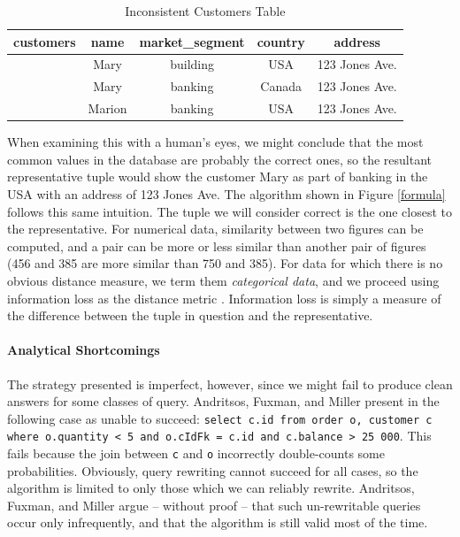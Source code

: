 \begin{table}[h]\begin{center}
        \begin{tabular}{r | c  c  c  c } 
					customers & name & market\_segment & country & address\\ \hline
	           		 & Mary   & building & USA    & 123 Jones Ave. \\ 
	         		 & Mary   & banking  & Canada & 123 Jones Ave. \\ 
					 & Marion & banking  & USA    & 123 Jones Ave. \\ 
        \end{tabular}
        \caption[Inconsistent Customers Table]{Inconsistent Customers Table \cite{CA}\label{rep}}
\end{center}\end{table}

When examining this with a human's eyes, we might conclude that the most common values in the database are probably the correct ones, so the resultant representative tuple would show the customer Mary as part of banking in the USA with an address of 123 Jones Ave. The algorithm shown in Figure \ref{formula} follows this same intuition. The tuple we will consider correct is the one closest to the representative. For numerical data, similarity between two figures can be computed, and a pair can be more or less similar than another pair of figures (456 and 385 are more similar than 750 and 385). For data for which there is no obvious distance measure, we term them \textit{categorical data}, and we proceed using information loss as the distance metric \cite{CA}. Information loss is simply a measure of the difference between  the tuple in question and the representative. 

\paragraph{Analytical Shortcomings}

The strategy presented is imperfect, however, since we might fail to produce clean answers for some classes of query. Andritsos, Fuxman, and Miller present in \cite{CA} the following case as unable to succeed: \texttt{select c.id from order o, customer c  where o.quantity < 5 and o.cIdFk = c.id and c.balance > 25~000}. This fails because the join between \texttt{c} and \texttt{o} incorrectly double-counts some probabilities. Obviously, query rewriting cannot succeed for all cases, so the algorithm is limited to only those which we can reliably rewrite. Andritsos, Fuxman, and Miller argue -- without proof -- that  such un-rewritable queries occur only infrequently, and that the algorithm is still valid most of the time.

